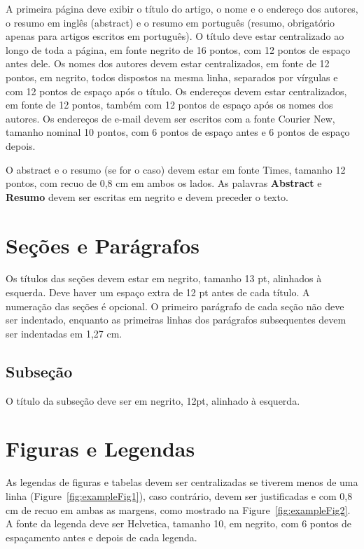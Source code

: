 \documentclass[12pt]{article}
\begin{document}
A primeira página deve exibir o título do artigo, o nome e o endereço dos autores, o resumo em inglês (abstract) e o resumo em português (resumo, obrigatório apenas para artigos escritos em português). O título deve estar centralizado ao longo de toda a página, em fonte negrito de 16 pontos, com 12 pontos de espaço antes dele. Os nomes dos autores devem estar centralizados, em fonte de 12 pontos, em negrito, todos dispostos na mesma linha, separados por vírgulas e com 12 pontos de espaço após o título. Os endereços devem estar centralizados, em fonte de 12 pontos, também com 12 pontos de espaço após os nomes dos autores. Os endereços de e-mail devem ser escritos com a fonte Courier New, tamanho nominal 10 pontos, com 6 pontos de espaço antes e 6 pontos de espaço depois.

O abstract e o resumo (se for o caso) devem estar em fonte Times, tamanho 12 pontos, com recuo de 0,8 cm em ambos os lados. As palavras \textbf{Abstract} e \textbf{Resumo} devem ser escritas em negrito e devem preceder o texto.

\section{Seções e Parágrafos}

Os títulos das seções devem estar em negrito, tamanho 13 pt, alinhados à esquerda. Deve haver um espaço extra de 12 pt antes de cada título. A numeração das seções é opcional. O primeiro parágrafo de cada seção não deve ser indentado, enquanto as primeiras linhas dos parágrafos subsequentes devem ser indentadas em 1,27 cm.

\subsection{Subseção}

O título da subseção deve ser em negrito, 12pt, alinhado à esquerda.

\section{Figuras e Legendas}\label{sec:figs}

As legendas de figuras e tabelas devem ser centralizadas se tiverem menos de uma linha (Figure~\ref{fig:exampleFig1}), caso contrário, devem ser justificadas e com 0,8 cm de recuo em ambas as margens, como mostrado na Figure~\ref{fig:exampleFig2}. A fonte da legenda deve ser Helvetica, tamanho 10, em negrito, com 6 pontos de espaçamento antes e depois de cada legenda.
\end{document}

